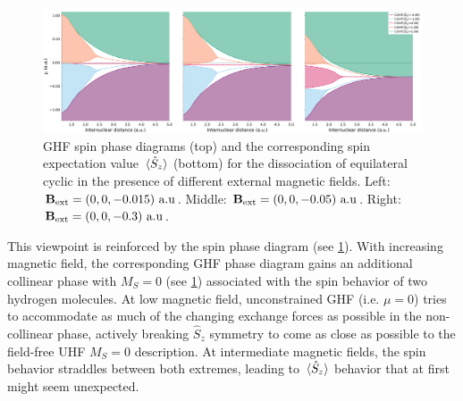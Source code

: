 \documentclass[journal=jctc,manuscript=article]{achemso}
\begin{document}
        \begin{figure}
            \centering
            \includegraphics[width=\textwidth]{GHF-spin-phase-diagram(H4)}
            \caption{
                GHF spin phase diagrams (top) and the corresponding spin expectation value $\ev*{\hat{S}_z}$ (bottom) for the dissociation of equilateral cyclic  in the presence of different external magnetic fields.
                Left: $\vb{B}_{\text{ext}} = (0,0,-0.015)\text{ a.u}$.
                Middle: $\vb{B}_{\text{ext}} = (0,0,-0.05)\text{ a.u}$.
                Right: $\vb{B}_{\text{ext}} = (0,0,-0.3)\text{ a.u}$.
            }
            \label{fig:GHF-spin-phase-diagram-H4}
        \end{figure}


        This viewpoint is reinforced by the spin phase diagram (see \cref{fig:GHF-spin-phase-diagram-H4}). With increasing magnetic field, the corresponding GHF phase diagram gains an additional collinear phase with $M_S=0$ (see \cref{fig:GHF-spin-phase-diagram-H4}) associated with the spin behavior of two hydrogen molecules.
        At low magnetic field, unconstrained GHF (i.e. $\mu=0$) tries to accommodate as much of the changing exchange forces as possible in the non-collinear phase, actively breaking $\hat{S}_z$ symmetry to come as close as possible to the field-free UHF $M_S=0$ description.
        At intermediate magnetic fields, the spin behavior straddles between both extremes, leading to $\ev*{\hat{S}_z}$ behavior that at first might seem unexpected.
        
\end{document}
